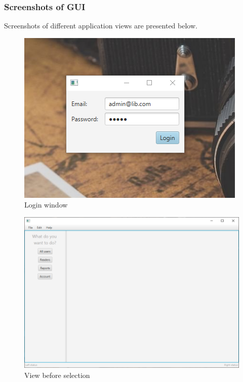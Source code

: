 \subsubsection{Screenshots of GUI}
Screenshots of different application views are presented below. 


\begin{figure}[H]
    \centering
    \includegraphics[width=\textwidth]{Include/Resources/FrontendScreens/JavaFX/adminLogin.png}
    \caption{Login window}
    \label{fig:ScreenshotGUIadminLogin}
\end{figure}




\begin{figure}[H]
    \centering
    \includegraphics[width=\textwidth]{Include/Resources/FrontendScreens/JavaFX/adminNotSelected.png}
    \caption{View before selection}
    \label{fig:ScreenshotGUIadminNotSelected}
\end{figure}




